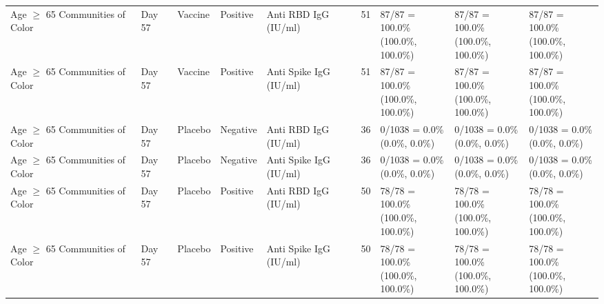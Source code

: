 \documentclass[]{book}
\theoremstyle{definition}
\theoremstyle{definition}
\theoremstyle{definition}
\newcommand{\1}{\mathbbm{1}}
\begin{document}
\begin{landscape}
\begin{ThreePartTable}
\begin{longtable}[t]{>{\raggedright\arraybackslash}p{2.7cm}llllllll}
\hspace{1em}Age $\geq$ 65 Communities of Color & Day 57 & Vaccine & Positive & Anti RBD IgG (IU/ml) & 51 & \makecell[l]{87/87 = 100.0\%\\(100.0\%, 100.0\%)} & \makecell[l]{87/87 = 100.0\%\\(100.0\%, 100.0\%)} & \makecell[l]{87/87 = 100.0\%\\(100.0\%, 100.0\%)}\\
\hspace{1em}Age $\geq$ 65 Communities of Color & Day 57 & Vaccine & Positive & Anti Spike IgG (IU/ml) & 51 & \makecell[l]{87/87 = 100.0\%\\(100.0\%, 100.0\%)} & \makecell[l]{87/87 = 100.0\%\\(100.0\%, 100.0\%)} & \makecell[l]{87/87 = 100.0\%\\(100.0\%, 100.0\%)}\\
\hspace{1em}Age $\geq$ 65 Communities of Color & Day 57 & Placebo & Negative & Anti RBD IgG (IU/ml) & 36 & \makecell[l]{0/1038 = 0.0\%\\(0.0\%, 0.0\%)} & \makecell[l]{0/1038 = 0.0\%\\(0.0\%, 0.0\%)} & \makecell[l]{0/1038 = 0.0\%\\(0.0\%, 0.0\%)}\\
\hspace{1em}Age $\geq$ 65 Communities of Color & Day 57 & Placebo & Negative & Anti Spike IgG (IU/ml) & 36 & \makecell[l]{0/1038 = 0.0\%\\(0.0\%, 0.0\%)} & \makecell[l]{0/1038 = 0.0\%\\(0.0\%, 0.0\%)} & \makecell[l]{0/1038 = 0.0\%\\(0.0\%, 0.0\%)}\\
\hspace{1em}Age $\geq$ 65 Communities of Color & Day 57 & Placebo & Positive & Anti RBD IgG (IU/ml) & 50 & \makecell[l]{78/78 = 100.0\%\\(100.0\%, 100.0\%)} & \makecell[l]{78/78 = 100.0\%\\(100.0\%, 100.0\%)} & \makecell[l]{78/78 = 100.0\%\\(100.0\%, 100.0\%)}\\
\hspace{1em}Age $\geq$ 65 Communities of Color & Day 57 & Placebo & Positive & Anti Spike IgG (IU/ml) & 50 & \makecell[l]{78/78 = 100.0\%\\(100.0\%, 100.0\%)} & \makecell[l]{78/78 = 100.0\%\\(100.0\%, 100.0\%)} & \makecell[l]{78/78 = 100.0\%\\(100.0\%, 100.0\%)}\\

\end{longtable}
\end{ThreePartTable}
\end{landscape}
\end{document}
